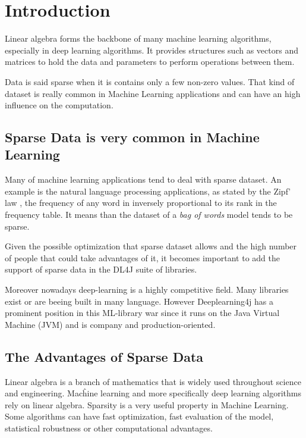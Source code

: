 \chapter{Introduction}


Linear algebra forms the backbone of many machine learning algorithms, especially in deep learning algorithms. It provides structures such as vectors and matrices to hold the data and parameters to perform operations between them. 

Data is said sparse when it is contains only a few non-zero values. That kind of dataset is really common in Machine Learning applications and can have an high influence on the computation. 

\section{Sparse Data is very common in Machine Learning}

Many of machine learning applications tend to deal with sparse dataset. An example is the natural language processing applications, as stated by the Zipf' law \cite{Zipf}, the frequency of any word in inversely proportional to its rank in the frequency table. It means than the dataset of a \textit{bag of words} model tends to be sparse.


Given the possible optimization that sparse dataset allows and the high number of people that could take advantages of it, it becomes important to add the support of sparse data in the DL4J suite of libraries. 

Moreover nowadays deep-learning is a highly competitive field. Many libraries exist or are beeing built in many language. However Deeplearning4j has a prominent position in this ML-library war since it runs on the Java Virtual Machine (JVM) and is company and production-oriented.



\section{The Advantages of Sparse Data}
Linear algebra is a branch of mathematics that is widely used throughout science and engineering. Macĥine learning and more specifically deep learning algorithms rely on linear algebra. Sparsity is a very useful property in Machine Learning. Some algorithms can have fast optimization, fast evaluation of the model, statistical robustness or other computational advantages.


